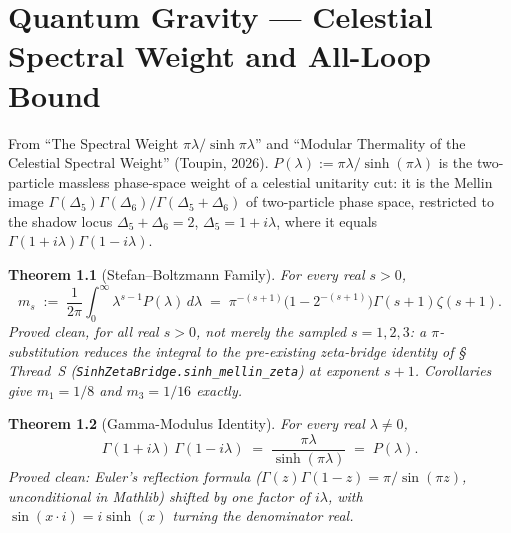 \documentclass{report}
\newtheorem{theorem}{Theorem}[chapter]
\theoremstyle{definition}
\begin{document}
\chapter{Quantum Gravity --- Celestial Spectral Weight and All-Loop Bound}

From ``The Spectral Weight $\pi\lambda/\sinh\pi\lambda$'' and ``Modular Thermality of the
Celestial Spectral Weight'' (Toupin, 2026). $P(\lambda) := \pi\lambda/\sinh(\pi\lambda)$ is
the two-particle massless phase-space weight of a celestial unitarity cut: it is the Mellin
image $\Gamma(\Delta_5)\Gamma(\Delta_6)/\Gamma(\Delta_5+\Delta_6)$ of two-particle phase space,
restricted to the shadow locus $\Delta_5+\Delta_6=2$, $\Delta_5=1+i\lambda$, where it equals
$\Gamma(1+i\lambda)\Gamma(1-i\lambda)$.

\begin{theorem}[Stefan--Boltzmann Family]
  \label{thm:stefan-boltzmann-family}
  \leanok
  For every real $s > 0$,
  \[
    m_s \;:=\; \frac{1}{2\pi}\int_0^\infty \lambda^{s-1} P(\lambda)\,d\lambda
    \;=\; \pi^{-(s+1)}\bigl(1-2^{-(s+1)}\bigr)\Gamma(s+1)\zeta(s+1).
  \]
  \emph{Proved clean, for all real $s>0$}, not merely the sampled $s=1,2,3$: a
  $\pi$-substitution reduces the integral to the pre-existing zeta-bridge identity of
  \S\,Thread~S (\texttt{SinhZetaBridge.sinh\_mellin\_zeta}) at exponent $s+1$. Corollaries
  give $m_1 = 1/8$ and $m_3 = 1/16$ exactly.
\end{theorem}

\begin{theorem}[Gamma-Modulus Identity]
  \label{thm:gamma-modulus}
  \leanok
  For every real $\lambda \neq 0$,
  \[
    \Gamma(1+i\lambda)\,\Gamma(1-i\lambda) \;=\; \frac{\pi\lambda}{\sinh(\pi\lambda)} \;=\; P(\lambda).
  \]
  \emph{Proved clean}: Euler's reflection formula
  ($\Gamma(z)\Gamma(1-z) = \pi/\sin(\pi z)$, unconditional in Mathlib) shifted by one factor
  of $i\lambda$, with $\sin(x\cdot i) = i\sinh(x)$ turning the denominator real.
\end{theorem}
\end{document}
